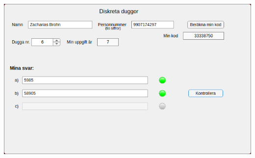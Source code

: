 \documentclass[a4paper,12pt]{article}
\begin{document}
%
\includegraphics[width=\textwidth]{BheKqYv.png}
%
\end{document}
